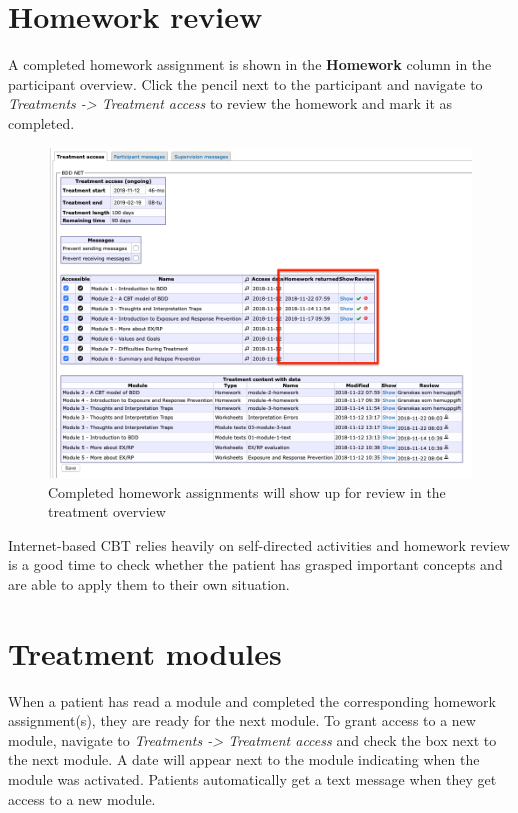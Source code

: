 \documentclass[]{book}
\theoremstyle{definition}
\theoremstyle{definition}
\theoremstyle{definition}
\theoremstyle{remark}
\begin{document}
\hypertarget{homework-review}{%
\section{Homework review}\label{homework-review}}

A completed homework assignment is shown in the \textbf{Homework} column
in the participant overview. Click the pencil next to the participant
and navigate to \emph{Treatments -\textgreater{} Treatment access} to
review the homework and mark it as completed.

\begin{figure}
\centering
\includegraphics{images/homework-complete.png}
\caption{Completed homework assignments will show up for review in the
treatment overview}
\end{figure}

Internet-based CBT relies heavily on self-directed activities and
homework review is a good time to check whether the patient has grasped
important concepts and are able to apply them to their own situation.

\hypertarget{treatment-modules}{%
\section{Treatment modules}\label{treatment-modules}}

When a patient has read a module and completed the corresponding
homework assignment(s), they are ready for the next module. To grant
access to a new module, navigate to \emph{Treatments -\textgreater{}
Treatment access} and check the box next to the next module. A date will
appear next to the module indicating when the module was activated.
Patients automatically get a text message when they get access to a new
module.
\end{document}
